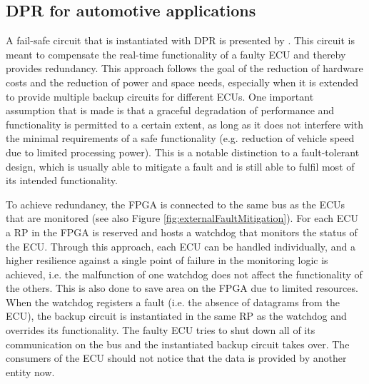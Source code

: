 \subsection{\gls{DPR} for automotive applications}
A fail-safe circuit that is instantiated with \gls{DPR} is presented by \cite{crdl_fail-safe_2002}. 
This circuit is meant to compensate the real-time functionality of a faulty \gls{ECU} and thereby provides redundancy.
This approach follows the goal of the reduction of hardware costs and the reduction of power and space needs, especially when it is extended to provide multiple backup circuits for different \glspl{ECU}.
One important assumption that is made is that a graceful degradation of performance and functionality is permitted to a certain extent, as long as it does not interfere with the minimal requirements of a safe functionality (e.g. reduction of vehicle speed due to limited processing power).
This is a notable distinction to a fault-tolerant design, which is usually able to mitigate a fault and is still able to fulfil most of its intended functionality.

To achieve redundancy, the \gls{FPGA} is connected to the same bus as the \glspl{ECU} that are monitored (see also Figure \ref{fig:externalFaultMitigation}).
For each \gls{ECU} a \gls{RP} in the \gls{FPGA} is reserved and hosts a watchdog that monitors the status of the \gls{ECU}.
Through this approach, each \gls{ECU} can be handled individually, and a higher resilience against a single point of failure in the monitoring logic is achieved, i.e. the malfunction of one watchdog does not affect the functionality of the others.
This is also done to save area on the \gls{FPGA} due to limited resources.
When the watchdog registers a fault (i.e. the absence of datagrams from the \gls{ECU}), the backup circuit is instantiated in the same \gls{RP} as the watchdog and overrides its functionality.
The faulty \gls{ECU} tries to shut down all of its communication on the bus and the instantiated backup circuit takes over.
The consumers of the \gls{ECU} should not notice that the data is provided by another entity now.

